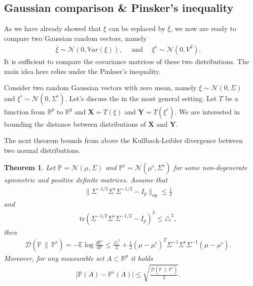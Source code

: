 \documentclass[12pt]{article}
\renewcommand{\=}[1]{\stackrel{#1}{=}} %
\newtheorem{thm}{Theorem}[section]
\begin{document}
\subsection{Gaussian comparison \& Pinsker's inequality} 
As we have already showed that $\xi$ can be replaced by $\overline{\xi}$, we now are ready to compare two Gaussian random vectors, namely 
\begin{align}
\overline{\xi} \sim \mathcal{N}(0, \mathbb{V}ar(\xi)), \quad \text{ and } \quad \xi^{\flat} \sim \mathcal{N}(0, V^2).
\end{align}
It is sufficient to compare the covariance matrices of these two distributions. The main idea here relies under the Pinkser's inequality. 
\par Consider two random Gaussian vectors with zero mean, namely $\xi \sim \mathcal{N}(0, \Sigma)$ and $\xi^{\flat} \sim \mathcal{N}(0, \Sigma^{\flat})$. Let's discuss the in the most general setting. Let $T$ be a function from $\mathbb{R}^p$ to $\mathbb{R}^q$ and $\mathbf{X} = T(\xi)$ and $\mathbf{Y} = T(\xi^{\flat})$. We are interested in bounding the distance between distributions of $\mathbf{X}$ and $\mathbf{Y}$. 
\par The next theorem bounds from above the Kullback-Leibler divergence between two normal distributions. 
\begin{thm}
Let $\mathbb{P} = \mathcal{N}(\mu, \Sigma)$ and $\mathbb{P}^{\flat} = \mathcal{N}(\mu^{\flat}, \Sigma^{\flat})$ for some non-degenerate symmetric and positive definite matrices. Assume that 
\begin{align}\label{29}
\| \Sigma^{-1/2} \Sigma^{\flat} \Sigma^{-1/2} - I_p \|_{\text{op}} \le \frac 1 2
\end{align}
and 
\begin{align}\label{30}
\text{tr}\left(\Sigma^{-1/2} \Sigma^{\flat} \Sigma^{-1/2} - I_p\right)^2 \le \triangle^2,
\end{align}
then 
\begin{align}
\mathcal{D}(\mathbb{P} \, \| \, \mathbb{P}^{\flat}) = - \mathbb{E} \log \frac{d \mathbb{P}^{\flat}}{d\mathbb{P}} \le \frac{\triangle^2}{2} + \frac 1 2 (\mu - \mu^{\flat})^T \Sigma^{-1} \Sigma^{\flat} \Sigma^{-1}(\mu - \mu^{\flat}).
\end{align}
Moreover, for any measurable set $A \subset \mathbb{R}^p$ it holds 
\begin{align}
\big | \mathbb{P}(A) - \mathbb{P}^{\flat}(A) \big| \le \sqrt{\frac{\mathcal{D}(\mathbb{P} \, \| \, \mathbb{P}^{\flat}) }{2}}.
\end{align}
\end{thm}
\end{document}
